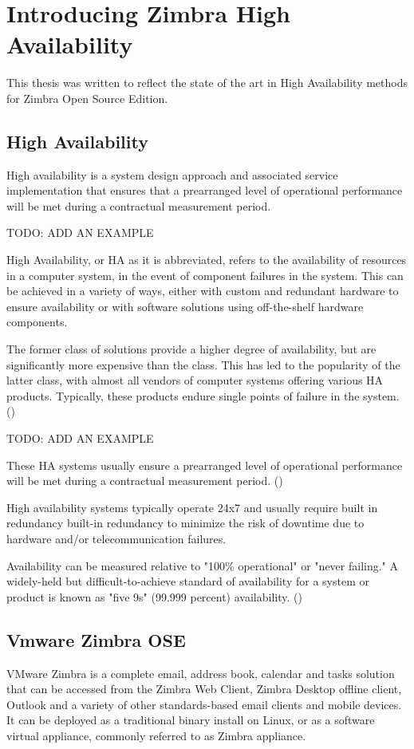 

\chapter{Introducing Zimbra High Availability}
This thesis was written to reflect the state of the art in High Availability methods for Zimbra Open Source Edition.  

\section {High Availability}
High availability is a system design approach and associated service implementation that ensures that a prearranged level of operational performance will be met during a contractual measurement period.

TODO: ADD AN EXAMPLE

High Availability, or HA as it is abbreviated, refers to the availability of resources in a computer system, in the event of component failures in the system. This can be achieved in a variety of ways, either with custom and redundant hardware to ensure availability or with software solutions using off-the-shelf hardware components.

The former class of solutions provide a higher degree of availability, but are significantly more expensive than the class. This has led to the popularity of the latter class, with almost all vendors of computer systems offering various HA products. Typically, these products endure single points of failure in the system. (\cite{TaskForceHA})

TODO: ADD AN EXAMPLE

These HA systems usually ensure a prearranged level of operational performance will be met during a contractual measurement period. (\cite{WikipediaHA})

High availability systems typically operate 24x7 and usually require built in redundancy built-in redundancy to minimize the risk of downtime due to hardware and/or telecommunication failures. 

Availability can be measured relative to "100\% operational" or "never failing." A widely-held but difficult-to-achieve standard of availability for a system or product is known as "five 9s" (99.999 percent) availability. (\cite{BCMHA})


\section {Vmware Zimbra OSE}
VMware Zimbra is a complete email, address book, calendar and tasks solution that can be accessed from the Zimbra Web Client, Zimbra Desktop offline client, Outlook and a variety of other standards-based email clients and mobile devices. It can be deployed as a traditional binary install on Linux, or as a software virtual appliance, commonly referred to as Zimbra appliance.


